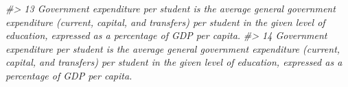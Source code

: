 \documentclass[
  xelatex, ja=standard]{bxjsbook}
\newenvironment{Shaded}{\begin{snugshade}}{\end{snugshade}}
\newcommand{\CommentTok}[1]{\textcolor[rgb]{0.56,0.35,0.01}{\textit{#1}}}
\theoremstyle{definition}
\theoremstyle{definition}
\theoremstyle{definition}
\theoremstyle{definition}
\theoremstyle{remark}
\begin{document}
\begin{Shaded}
\begin{Highlighting}[]
\CommentTok{\#\textgreater{} 13                                                                                                                                                                                                                                                                                                                                                                                                                                                                                                                                                                                                                                                                                                                                                                                                                                                                                                                                                                                                                                                                                                                                                                                                                                      Government expenditure per student is the average general government expenditure (current, capital, and transfers) per student in the given level of education, expressed as a percentage of GDP per capita.}
\CommentTok{\#\textgreater{} 14                                                                                                                                                                                                                                                                                                                                                                                                                                                                                                                                                                                                                                                                                                                                                                                                                                                                                                                                                                                                                                                                                                                                                                                                                                      Government expenditure per student is the average general government expenditure (current, capital, and transfers) per student in the given level of education, expressed as a percentage of GDP per capita.}

\end{Highlighting}
\end{Shaded}
\end{document}

